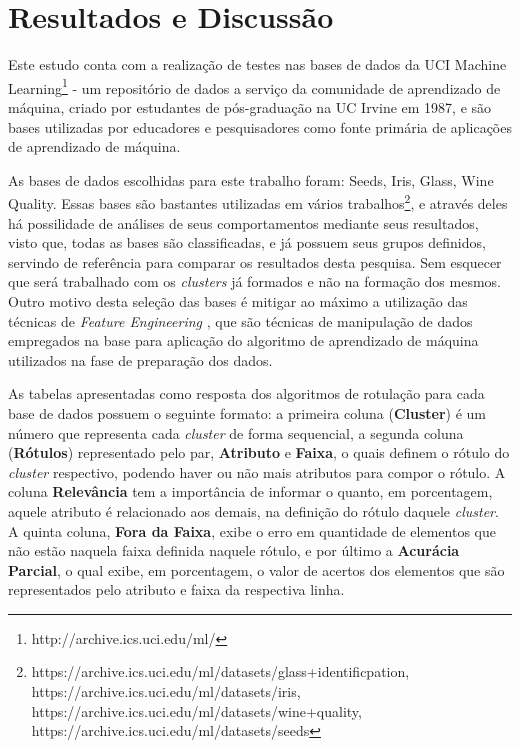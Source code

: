 \chapter{Resultados e Discussão}\label{cap:resultados}

Este estudo conta com a realização de testes nas bases de dados da UCI Machine Learning\footnote{http://archive.ics.uci.edu/ml/} - um repositório de dados a serviço da comunidade de aprendizado de máquina, criado por estudantes de pós-graduação na UC Irvine em 1987, e são bases utilizadas por educadores e pesquisadores como fonte primária de aplicações de aprendizado de máquina. 


As bases de dados escolhidas para este trabalho foram: Seeds, Iris, Glass, Wine Quality. Essas bases são bastantes utilizadas em vários trabalhos\footnote{https://archive.ics.uci.edu/ml/datasets/glass+identificpation, https://archive.ics.uci.edu/ml/datasets/iris, https://archive.ics.uci.edu/ml/datasets/wine+quality, https://archive.ics.uci.edu/ml/datasets/seeds}, e através deles há possilidade de análises de seus comportamentos mediante seus resultados, visto que, todas as bases são classificadas, e já possuem seus grupos definidos, servindo de referência para  comparar  os resultados desta pesquisa. Sem esquecer que será trabalhado com os \textit{clusters} já formados e não na formação dos mesmos. Outro motivo desta seleção das bases  é mitigar ao máximo a utilização das técnicas de \textit{Feature Engineering} \cite{Casari2018}, que são técnicas de manipulação de dados empregados na base para aplicação do algoritmo de aprendizado de máquina utilizados na fase de preparação dos dados.
 

As tabelas apresentadas como resposta dos algoritmos de rotulação para cada base de dados possuem o seguinte formato: a primeira coluna (\textbf{Cluster}) é um número que representa cada \textit{cluster} de forma sequencial, a segunda coluna (\textbf{Rótulos}) representado pelo par, \textbf{Atributo} e \textbf{Faixa}, o quais definem o rótulo do \textit{cluster} respectivo, podendo haver ou não mais atributos para compor o rótulo. A coluna \textbf{Relevância} tem a importância de informar o quanto, em porcentagem, aquele atributo é relacionado aos demais, na definição do rótulo daquele \textit{cluster}. A quinta coluna, \textbf{Fora da Faixa}, exibe o erro em quantidade de elementos que não estão naquela faixa definida naquele rótulo, e por último a \textbf{Acurácia Parcial}, o qual exibe, em porcentagem, o valor de acertos dos elementos que são representados pelo atributo e faixa da respectiva linha. 

